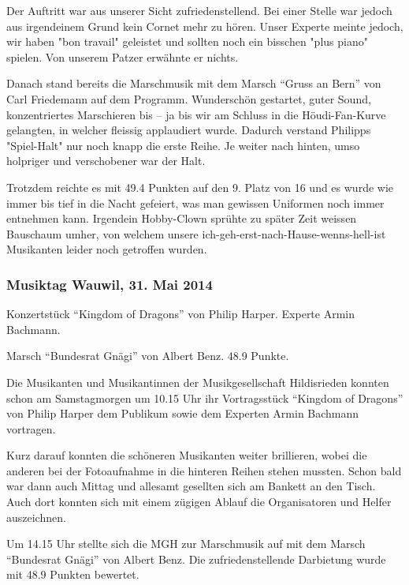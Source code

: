 \begin{history}
    Der Auftritt war aus unserer Sicht zufriedenstellend. Bei einer Stelle war
    jedoch aus irgendeinem Grund kein Cornet mehr zu hören. Unser Experte meinte
    jedoch, wir haben "bon travail" geleistet und sollten noch ein bisschen
    "plus piano" spielen. Von unserem Patzer erwähnte er nichts.

    Danach stand bereits die Marschmusik mit dem Marsch \enquote{Gruss an Bern}
    von Carl Friedemann auf dem Programm. Wunderschön gestartet, guter Sound,
    konzentriertes Marschieren bis -- ja bis wir am Schluss in die
    Höudi-Fan-Kurve gelangten, in welcher fleissig applaudiert wurde. Dadurch
    verstand Philipps "Spiel-Halt" nur noch knapp die erste Reihe. Je weiter
    nach hinten, umso holpriger und verschobener war der Halt.

    Trotzdem reichte es mit 49.4 Punkten auf den 9. Platz von 16 und es wurde
    wie immer bis tief in die Nacht gefeiert, was man gewissen Uniformen noch
    immer entnehmen kann. Irgendein Hobby-Clown sprühte zu später Zeit weissen
    Bauschaum umher, von welchem unsere ich-geh-erst-nach-Hause-wenns-hell-ist
    Musikanten leider noch getroffen wurden.


    \subsubsection*{Musiktag Wauwil, 31. Mai 2014}

    Konzertstück \enquote{Kingdom of Dragons} von Philip Harper. Experte Armin
    Bachmann.

    Marsch \enquote{Bundesrat Gnägi} von Albert Benz. 48.9 Punkte.

    Die Musikanten und Musikantinnen der Musikgesellschaft Hildisrieden konnten
    schon am Samstagmorgen um 10.15 Uhr ihr Vortragsstück  \enquote{Kingdom of
        Dragons} von Philip Harper dem Publikum sowie dem Experten Armin Bachmann
    vortragen.

    Kurz darauf konnten die schöneren Musikanten weiter brillieren, wobei die
    anderen bei der Fotoaufnahme in die hinteren Reihen stehen mussten. Schon
    bald war dann auch Mittag und allesamt gesellten sich am Bankett an den
    Tisch. Auch dort konnten sich mit einem zügigen Ablauf die Organisatoren und
    Helfer auszeichnen.

    Um 14.15 Uhr stellte sich die MGH zur Marschmusik auf mit dem Marsch
    \enquote{Bundesrat Gnägi} von Albert Benz. Die zufriedenstellende Darbietung
    wurde mit 48.9 Punkten bewertet.



\end{history}
